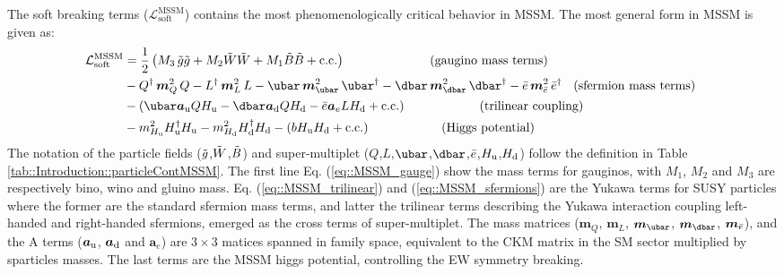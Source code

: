 The soft breaking terms ($\mathcal{L}^{\mathrm{MSSM}}_{\mathrm{soft}}$) contains the most phenomenologically critical behavior in MSSM. The most general form in MSSM is given as:
%
\begin{align}
\mathcal{L}^{\mathrm{MSSM}}_{\mathrm{soft}} 
& = \frac{1}{2} \left( M_3 \, \tg\tg + M_2 \tW\tW + M_1 \tB\tB + \mathrm{c.c.}  \right)  \mbox{\phantom{MMMMMMM} (gaugino mass terms)}  \label{eq::MSSM_gauge} \\
%
& - Q^{\dg} \, \bm{m}_{Q}^2    \, Q 
  - L^{\dg} \, \bm{m}_{L}^2    \, L 
  - \ubar    \, \bm{m}_{\ubar}^2 \, \ubar^{\dg} 
  - \dbar    \, \bm{m}_{\dbar}^2 \, \dbar^{\dg} 
  - \ebar    \, \bm{m}_{\ebar}^2 \, \ebar^{\dg}  \mbox{\phantom{M}(sfermion mass terms)  }  \label{eq::MSSM_sfermions} \\
%
& -  \left( 
  \ubar \bm{a}_\mup Q H_\mup 
- \dbar \bm{a}_\mdn Q H_\mdn 
- \ebar \bm{a}_e    L H_\mdn 
+ \mathrm{c.c.}  \right)  \mbox{\phantom{MMMMMM} (trilinear coupling)} \label{eq::MSSM_trilinear} \\
%
& - m^2_{H_\mup} H_{\mup}^{\dg} H_\mup  
  - m^2_{H_\mdn} H_{\mdn}^{\dg} H_\mdn  
  - (b H_\mup H_\mdn + \mathrm{c.c.})   \mbox{\phantom{MMMMMM} (Higgs potential)} \label{eq::MSSM_higgs}
%
\end{align}
The notation of the particle fields ($\tilde{g}$,$\tilde{W}$,$\tilde{B}$) and super-multiplet ($Q$,$L$,$\ubar$,$\dbar$,$\bar{e}$,$H_{\mathrm{u}}$,$H_{\mathrm{d}}$) follow the definition in Table \ref{tab::Introduction::particleContMSSM}.
The first line Eq. (\ref{eq::MSSM_gauge}) show the mass terms for gauginos, with $M_1$, $M_2$ and $M_3$ are respectively bino, wino and gluino mass. Eq. (\ref{eq::MSSM_trilinear}) and (\ref{eq::MSSM_sfermions}) are the Yukawa terms for SUSY particles where the former are the standard sfermion mass terms, and latter the trilinear terms describing the Yukawa interaction coupling left-handed and right-handed sfermions, emerged as the cross terms of super-multiplet. The mass matrices ($\bm{m}_Q$, $\bm{m}_L$, $\bm{m}_{\ubar}$, $\bm{m}_{\dbar}$, $\bm{m}_{\bar{e}}$), and the A terms ($\bm{a}_{\mathrm{u}}$, $\bm{a}_{\mathrm{d}}$ and $\bm{a}_e$) are $3\times3$ matices spanned in family space, equivalent to the CKM matrix in the SM sector multiplied by sparticles masses. The last terms \label{eq::MSSM_higgs} are the MSSM higgs potential, controlling the EW symmetry breaking.  \\



